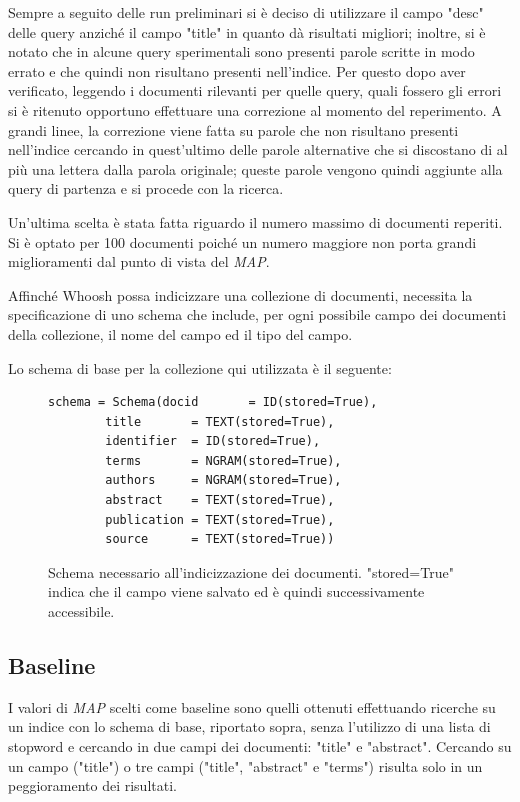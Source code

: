 \documentclass[runningheads]{llncs}
\begin{document}
Sempre a seguito delle run preliminari si \`e deciso di utilizzare il campo "desc" delle query anzich\'e il campo "title" in quanto d\`a risultati migliori; inoltre, si \`e notato che in alcune query sperimentali sono presenti parole scritte in modo errato e che quindi non risultano presenti nell'indice.
Per questo dopo aver verificato, leggendo i documenti rilevanti per quelle query, quali fossero gli errori si \`e ritenuto opportuno effettuare una correzione al momento del reperimento.
A grandi linee, la correzione viene fatta su parole che non risultano presenti nell'indice cercando in quest'ultimo delle parole alternative che si discostano di al pi\`u una lettera dalla parola originale; queste parole vengono quindi aggiunte alla query di partenza e si procede con la ricerca.

Un'ultima scelta \`e stata fatta riguardo il numero massimo di documenti reperiti.
Si \`e optato per 100 documenti poich\'e un numero maggiore non porta grandi miglioramenti dal punto di vista del \textit{MAP}. \par

Affinch\'e Whoosh possa indicizzare una collezione di documenti, necessita la
specificazione di uno schema che include, per ogni possibile campo dei documenti della collezione, il nome del campo ed il tipo del campo.

Lo schema di base per la collezione qui utilizzata \`e il seguente:
\par

\begin{figure}
\vspace{-5mm}
\begin{lstlisting}
schema = Schema(docid      	= ID(stored=True),
		title      	= TEXT(stored=True),
		identifier	= ID(stored=True),
		terms 		= NGRAM(stored=True),
		authors		= NGRAM(stored=True),
		abstract 	= TEXT(stored=True),
		publication	= TEXT(stored=True),
		source 		= TEXT(stored=True))
\end{lstlisting}
      \caption{Schema necessario all'indicizzazione dei documenti. "stored=True" indica che il campo viene salvato ed \`e quindi successivamente accessibile. }
      \vspace{-10mm}
\end{figure}


\subsection{Baseline}
I valori di \textit{MAP} scelti come baseline sono quelli ottenuti effettuando ricerche su un indice con lo schema di base, riportato sopra, senza l'utilizzo di una lista di stopword e cercando in due campi dei documenti: "title" e "abstract".
Cercando su un campo ("title") o tre campi ("title", "abstract" e "terms") risulta solo in un peggioramento dei risultati.
\end{document}

